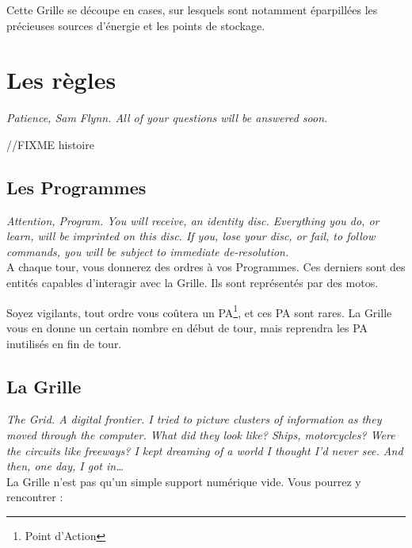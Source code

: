 Cette Grille se découpe en cases, sur lesquels sont notamment
éparpillées les précieuses sources d'énergie et les points de stockage.

\newpage
\section{Les règles}
\emph{Patience, Sam Flynn. All of your questions will be answered soon.}

//FIXME histoire

        \subsection{Les Programmes}
        \emph{Attention, Program. You will receive, an identity disc. Everything you do, or learn, will be imprinted on this disc. If you, lose your disc, or fail, to follow commands, you will be subject to immediate de-resolution.}\\

A chaque tour, vous donnerez des ordres à vos Programmes. Ces derniers
sont des entités capables d'interagir avec la Grille. Ils sont
représentés par des motos.

Soyez vigilants, tout ordre vous coûtera un PA\footnote{Point
  d'Action}, et ces PA sont rares. La Grille vous en donne un certain
nombre en début de tour, mais reprendra les PA inutilisés en fin de tour.

\subsection{La Grille}
        \emph{The Grid. A digital frontier. I tried to picture clusters
          of information as they moved through the computer. What did they
          look like? Ships, motorcycles? Were the circuits like freeways? I
          kept dreaming of a world I thought I'd never see. And then, one
          day, I got in\ldots{}}\\

La Grille n'est pas qu'un simple support numérique vide. Vous pourrez
y rencontrer :

